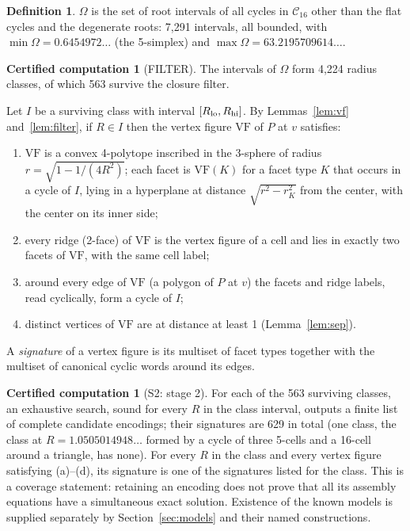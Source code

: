 \documentclass[11pt]{article}
\theoremstyle{definition}
\newtheorem{definition}[theorem]{Definition}
\newtheorem{computation}[theorem]{Certified computation}
\theoremstyle{remark}
\newcommand{\VF}{\mathrm{VF}}
\begin{document}
\begin{appendices}
\begin{definition}\label{def:omega}
$\Omega$ is the set of root intervals of all cycles in $\mathcal C_{16}$
other than the flat cycles and the degenerate roots: 7,291 intervals, all
bounded, with $\min\Omega=0.6454972\ldots$ (the 5-simplex) and
$\max\Omega=63.2195709614\ldots$.
\end{definition}

\begin{computation}[FILTER]\label{comp:filter}
The intervals of $\Omega$ form 4,224 radius classes, of which 563 survive
the closure filter.
\end{computation}

Let $I$ be a surviving class with interval $[R_{\rm lo},R_{\rm hi}]$. By
Lemmas~\ref{lem:vf} and~\ref{lem:filter}, if $R\in I$ then the vertex
figure $\VF$ of $P$ at $v$ satisfies:
\begin{enumerate}[label=(\alph*)]
\item $\VF$ is a convex 4-polytope inscribed in the 3-sphere of radius
  $r=\sqrt{1-1/(4R^2)}$; each facet is $\VF(K)$ for a facet type $K$ that
  occurs in a cycle of $I$, lying in a hyperplane at distance
  $\sqrt{r^2-r_K^2}$ from the center, with the center on its inner side;
\item every ridge (2-face) of $\VF$ is the vertex figure of a cell and lies
  in exactly two facets of $\VF$, with the same cell label;
\item around every edge of $\VF$ (a polygon of $P$ at $v$) the facets and
  ridge labels, read cyclically, form a cycle of $I$;
\item distinct vertices of $\VF$ are at distance at least 1
  (Lemma~\ref{lem:sep}).
\end{enumerate}
A \emph{signature} of a vertex figure is its multiset of facet types
together with the multiset of canonical cyclic words around its edges.

\begin{computation}[S2: stage 2]\label{comp:S2}
For each of the 563 surviving classes, an exhaustive search, sound for
every $R$ in the class interval, outputs a finite list of complete
candidate encodings; their signatures are 629 in total (one class, the class at
$R=1.0505014948\ldots$ formed by a cycle of three 5-cells and a 16-cell
around a triangle, has none). For every $R$ in the class and every vertex
figure satisfying (a)--(d), its signature is one of the signatures listed
for the class. This is a coverage statement: retaining an encoding does
not prove that all its assembly equations have a simultaneous exact
solution. Existence of the known models is supplied separately by
Section~\ref{sec:models} and their named constructions.
\end{computation}


\end{appendices}
\end{document}
